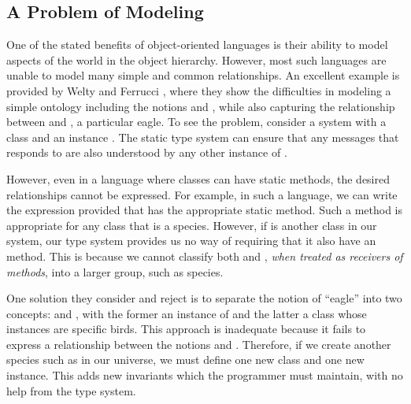 \documentclass[nocopyrightspace,10pt]{acm-sigplan}
\begin{document}
\subsection{A Problem of Modeling}
One of the stated benefits of object-oriented languages is their
ability to model aspects of the world in the object hierarchy.
However, most such languages are unable to model many simple and
common relationships.  An excellent example is provided by Welty and
Ferrucci \cite{FW96}, where they show the difficulties in modeling
a simple ontology including the notions {} and
{}, while also capturing the relationship between
{} and {}, a particular eagle.  To see the
problem, consider a system with a class  and an instance
.  The static type system can ensure that any messages that
 responds to are also understood by any other instance of
.

However, even in a language where classes can have static methods, the
desired relationships cannot be expressed.  For example, in such a
language, we can write the expression \linebreak[4]
provided that  has the appropriate static method.  Such a
method is appropriate for any class that is a species.  However, if
 is another class in our system, our type system provides
us no way of requiring that it also have an 
method.  This is because we cannot classify both  and
, \emph{when treated as receivers of methods}, into a
larger group, such as species.

One solution they consider and reject is to separate the notion of
``eagle'' into two concepts: {} and {}, with
the former an instance of {} and the latter a class whose
instances are specific birds.  This approach is inadequate because it
fails to express a relationship between the notions {}
and {}.  Therefore, if we create another species such as
 in our universe, we must define one new class and one new
instance.  This adds new invariants which the programmer must
maintain, with no help from the type system.  
\end{document}
